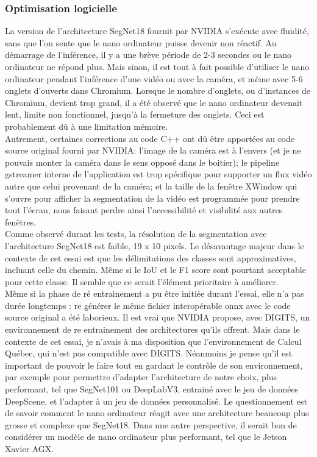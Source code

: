 \subsubsection{Optimisation logicielle}
\noindent La version de l'architecture SegNet18 fournit par NVIDIA s'exécute avec fluidité, sans que l'on sente que le nano ordinateur puisse devenir non réactif. Au démarrage de l'inférence, il y a une brève période de 2-3 secondes ou le nano ordinateur ne répond plus. Mais sinon, il est tout à fait possible d'utiliser le nano ordinateur pendant l'inférence d'une vidéo ou avec la caméra, et même avec 5-6 onglets d'ouverts dans Chromium. Lorsque le nombre d'onglets, ou d'instances de Chromium, devient trop grand, il a été observé que le nano ordinateur devenait lent, limite non fonctionnel, jusqu'à la fermeture des onglets. Ceci est probablement dû à une limitation mémoire.
\vspace{\baselineskip}
\\
\noindent Autrement, certaines corrections au code C++ ont dû être apportées au code source original fourni par NVIDIA: l'image de la caméra est à l'envers (et je ne pouvais monter la caméra dans le sens opposé dans le boitier); le pipeline gstreamer interne de l'application est trop spécifique pour supporter un flux vidéo autre que celui provenant de la caméra; et la taille de la fenêtre XWindow qui s'ouvre pour afficher la segmentation de la vidéo est programmée pour prendre tout l'écran, nous faisant perdre ainsi l'accessibilité et visibilité aux autres fenêtres.
\vspace{\baselineskip}
\\
\noindent Comme observé durant les tests, la résolution de la segmentation avec l'architecture SegNet18 est faible, 19 x 10 pixels. Le désavantage majeur dans le contexte de cet essai est que les délimitations des classes sont approximatives, incluant celle du chemin. Même si le IoU et le F1 score sont pourtant acceptable pour cette classe. Il semble que ce serait l'élément prioritaire à améliorer. 
\vspace{\baselineskip}
\\
\noindent Même si la phase de ré entrainement a pu être initiée durant l'essai, elle n'a pas durée longtemps : re générer le même fichier interopérable \acrshort{onnx} avec le code source original a été laborieux. Il est vrai que NVIDIA propose, avec DIGITS, un environnement de re entrainement des architectures qu'ils offrent. Mais dans le contexte de cet essai, je n'avais à ma disposition que l'environnement de Calcul Québec, qui n'est pas compatible avec DIGITS. Néanmoins je pense qu'il est important de pouvoir le faire tout en gardant le contrôle de son environnement, par exemple pour permettre d'adapter l'architecture de notre choix, plus performant, tel que SegNet101 ou DeepLabV3, entrainé avec le jeu de données DeepScene, et l'adapter à un jeu de données personnalisé. Le questionnement est de savoir comment le nano ordinateur réagit avec une architecture beaucoup plus grosse et complexe que SegNet18. Dans une autre perspective, il serait bon de considérer un modèle de nano ordinateur plus performant, tel que le Jetson Xavier AGX.
